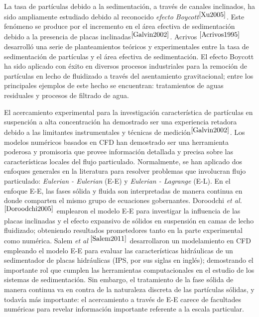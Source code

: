 La tasa de part\'iculas debido a la sedimentaci\'on, a trav\'es de canales inclinados, ha sido ampliamente estudiado debido al reconocido \textit{efecto Boycott}$^{\cite{Xu2005}}$. Este fen\'omeno se produce por el incremento en el \'area efectiva de sedimentaci\'on debido a la presencia de placas inclinadas$^{\cite{Galvin2002}}$. Acrivos $^{\cite{Acrivos1995}}$ desarroll\'o una serie de planteamientos te\'oricos y experimentales entre la tasa de sedimentaci\'on de part\'iculas y el \'area efectiva de sedimentaci\'on. El efecto Boycott ha sido aplicado con \'exito en diversos procesos industriales para la remoci\'on de part\'iculas en lecho de fluidizado a trav\'es del asentamiento gravitacional; entre los principales ejemplos de este hecho se encuentran: tratamientos de aguas residuales y procesos de filtrado de agua.

\noindent
\justify

El acercamiento experimental para la investigaci\'on caracter\'istica de part\'iculas en suspenci\'on a alta concentraci\'on ha demostrado ser una experiencia retadora debido a las limitantes instrumentales y t\'ecnicas de medici\'on$^{\cite{Galvin2002}}$. Los modelos num\'ericos basados en CFD han demostrado ser una herramienta poderosa y promisoria que provee informaci\'on detallada y precisa sobre las caracter\'isticas locales del flujo particulado. Normalmente, se han aplicado dos enfoques generales en la literatura para resolver problemas que involucran flujo particulado: \textit{Eulerian - Eulerian} (E-E) y \textit{Eulerian - Lagrange} (E-L). En el enfoque E-E, las fases s\'olida y fluida son interpretadas de manera continua en donde comparten el mismo grupo de ecuaciones gobernantes. Doroodchi \textit{et al.}$^{\cite{Doroodchi2005}}$ emplearon el modelo E-E para investigar la influencia de las placas inclinadas y el efecto expansivo de s\'olidos en suspensi\'on en camas de lecho fluidizado; obteniendo resultados prometedores tanto en la parte experimental como num\'erica. Salem \textit{et al} $^{\cite{Salem2011}}$ desarrollaron un modelamiento en CFD empleando el modelo E-E para evaluar las caracter\'isticas hidr\'aulicas de un sedimentador de placas hidr\'aulicas (IPS, por sus siglas en ingl\'es); demostrando el importante rol que cumplen las herramientas computacionales en el estudio de los sistemas de sedimentaci\'on. Sin embargo, el tratamiento de la fase s\'olida de manera continua va en contra de la naturaleza discreta de las part\'iculas s\'olidas, y todav\'ia m\'as importante: el acercamiento a trav\'es de E-E carece de facultades num\'ericas para revelar informaci\'on importante referente a la escala particular.

